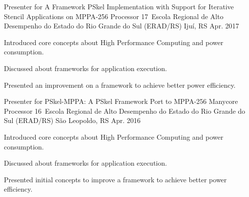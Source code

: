 \begin{cventries}
    \cventry
    {Presenter for A Framework PSkel Implementation with Support for Iterative
    Stencil Applications on MPPA-256 Processor}
    {17\textordmasculine~Escola Regional de Alto Desempenho do Estado do Rio Grande do Sul (ERAD/RS)} %
    {Ijuí, RS} %
    {Apr. 2017} %
    {
        \begin{cvitems} %
        \item {Introduced core concepts about High Performance Computing and
            power consumption.}
        \item {Discussed about frameworks for application execution.}
        \item {Presented an improvement on a framework to achieve better power
          efficiency.}
        \end{cvitems}
    }


  \cventry
    {Presenter for PSkel-MPPA: A PSkel Framework Port to MPPA-256 Manycore
    Processor}
    {16\textordmasculine~Escola Regional de Alto Desempenho do Estado do Rio Grande do Sul (ERAD/RS)} %
    {São Leopoldo, RS} %
    {Apr. 2016} %
    {
      \begin{cvitems} %
        \item {Introduced core concepts about High Performance Computing and
            power consumption.}
        \item {Discussed about frameworks for application execution.}
        \item {Presented initial concepts to improve a framework to achieve better power
          efficiency.}
      \end{cvitems}
    }

\end{cventries}
